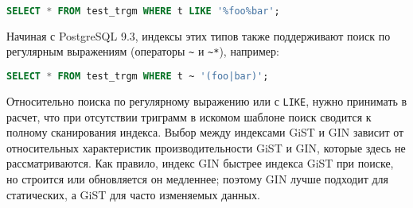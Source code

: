 \begin{lstlisting}[language=SQL,label=lst:pgtrgm5,caption=pg\_trgm]
SELECT * FROM test_trgm WHERE t LIKE '%foo%bar';
\end{lstlisting}

Начиная с PostgreSQL 9.3, индексы этих типов также поддерживают поиск по регулярным выражениям (операторы \lstinline!~! и \lstinline!~*!), например:

\begin{lstlisting}[language=SQL,label=lst:pgtrgm6,caption=pg\_trgm]
SELECT * FROM test_trgm WHERE t ~ '(foo|bar)';
\end{lstlisting}

Относительно поиска по регулярному выражению или с \lstinline!LIKE!, нужно принимать в расчет, что при отсутствии триграмм в искомом шаблоне поиск сводится к полному сканирования индекса. Выбор между индексами GiST и GIN зависит от относительных характеристик производительности GiST и GIN, которые здесь не рассматриваются. Как правило, индекс GIN быстрее индекса GiST при поиске, но строится или обновляется он медленнее; поэтому GIN лучше подходит для статических, а GiST для часто изменяемых данных.
